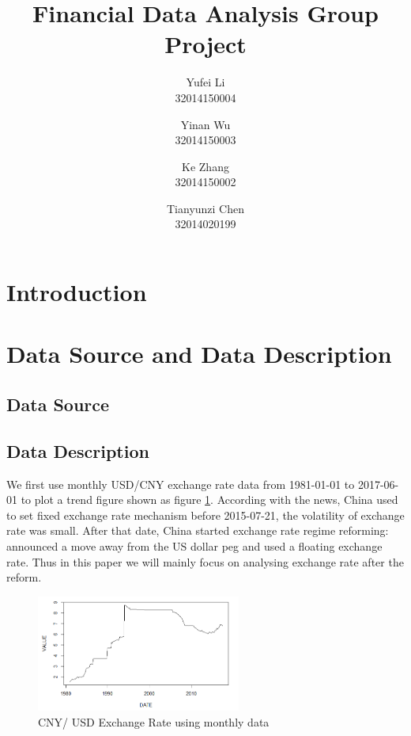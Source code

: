 \documentclass[12pt, a4paper, titlepage]{article}
\title{Financial Data Analysis Group Project\\
}
\author{Yufei Li  \\
	32014150004  \\
	\and 
	Yinan Wu \\
	32014150003 \\
	\and
	Ke Zhang\\
	32014150002\\
	\and
	Tianyunzi Chen\\
	32014020199
	}
\date{}
\begin{document}
\maketitle

\begin{abstract}

\end{abstract}

\tableofcontents 

\section{Introduction}


\section{Data Source and Data Description}
\subsection{Data Source}

\subsection{Data Description}
We first use monthly USD/CNY exchange rate data from 1981-01-01 to 2017-06-01 to plot a trend figure shown as figure \ref{monthly}. According with the news, China used to set fixed exchange rate mechanism before 2015-07-21, the volatility of exchange rate was small. After that date, China started exchange rate regime reforming: announced a move away from the US dollar peg and used a floating exchange rate. Thus in this paper we will mainly focus on analysing exchange rate after the reform.\\ 
\begin{figure}
\begin{center}
\caption{CNY/ USD Exchange Rate using monthly data}\label{monthly}
\includegraphics[width=0.6\textwidth]{monthly.png} 
\end{center}
\end{figure}
\end{document}
